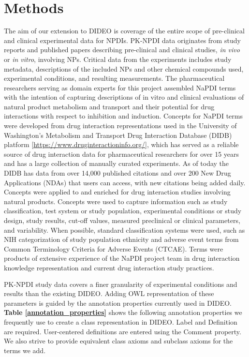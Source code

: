 \documentclass{bmcart}
\begin{document}
\section*{Methods}
The aim of our extension to DIDEO is coverage of the entire scope of pre-clinical and clinical experimental data for NPDIs.
PK-NPDI data originates from study reports and published papers describing pre-clinical and clinical studies, \textit{in vivo} or \textit{in vitro}, involving NPs.
Critical data from the experiments includes study metadata, descriptions of the included NPs and other chemical compounds used, experimental conditions, and resulting measurements.
The pharmaceutical researchers serving as domain experts for this project assembled NaPDI terms with the intention of capturing descriptions of in vitro and clinical evaluations of natural product metabolism and transport and their potential for drug interactions with respect to inhibition and induction.
Concepts for NaPDI terms were developed from drug interaction representations used in the University of Washington’s Metabolism and Transport Drug Interaction Database (DIDB) platform [\url{https://www.druginteractioninfo.org/}], which has served as a reliable source of drug interaction data for pharmaceutical researchers for over 15 years and has a large collection of manually curated experiments.
As of today the DIDB has data from over 14,000 published citations and over 200 New Drug Applications (NDAs) that users can access, with new citations being added daily.
Concepts were applied to and enriched for drug interaction studies involving natural products.
Concepts were used to capture information such as study classification, test system or study population, experimental conditions or study design, study results, cut-off values, measured preclinical or clinical parameters, and variability.
When possible, standard classification systems were used, such as NIH categorization of study population ethnicity and adverse event terms from Common Terminology Criteria for Adverse Events (CTCAE).
Terms were products of extensive experience of the NaPDI project team in drug interaction knowledge representation and current drug interaction study practices.

PK-NPDI study data covers a finer granularity of experimental conditions and results than the existing DIDEO.
Adding OWL representation of these parameters is guided by the annotation properties currently used in DIDEO.
\textbf{Table \ref{annotation_properties}} shows the following annotation properties we frequently use to create a class representation in DIDEO.
Label and Definition are required.
User-centered definitions are entered using the Comment property.
We also strive to provide equivalent class axioms and subclass axioms for the terms we add.
\end{document}
